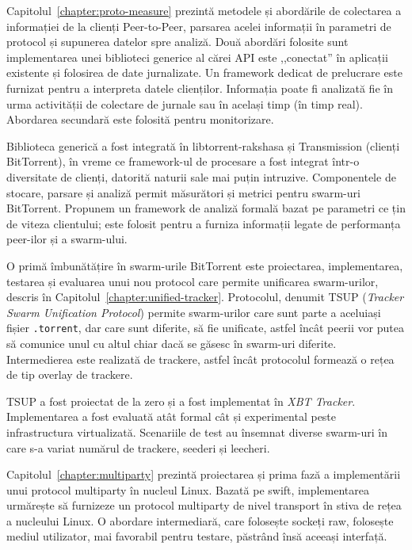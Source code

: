 Capitolul~\ref{chapter:proto-measure} prezintă metodele și abordările de
colectarea a informației de la clienți Peer-to-Peer, parsarea acelei
informații în parametri de protocol și supunerea datelor spre analiză. Două
abordări folosite sunt implementarea unei biblioteci generice al cărei API
este ,,conectat'' în aplicații existente și folosirea de date jurnalizate. Un
framework dedicat de prelucrare este furnizat pentru a interpreta datele
clienților. Informația poate fi analizată fie în urma activității de colectare
de jurnale sau în același timp (în timp real). Abordarea secundară este
folosită pentru monitorizare.

Biblioteca generică a fost integrată în libtorrent-rakshasa și Transmission
(clienți BitTorrent), în vreme ce framework-ul de procesare a fost integrat
într-o diversitate de clienți, datorită naturii sale mai puțin intruzive.
Componentele de stocare, parsare și analiză permit măsurători și metrici
pentru swarm-uri BitTorrent. Propunem un framework de analiză formală bazat pe
parametri ce țin de viteza clientului; este folosit pentru a furniza
informații legate de performanța peer-ilor și a swarm-ului.

O primă îmbunătățire în swarm-urile BitTorrent este proiectarea,
implementarea, testarea și evaluarea unui nou protocol care permite unificarea
swarm-urilor, descris în Capitolul~\ref{chapter:unified-tracker}. Protocolul,
denumit TSUP
(\textit{Tracker Swarm Unification Protocol}) permite swarm-urilor care sunt
parte a aceluiași fișier \texttt{.torrent}, dar care sunt diferite, să fie
unificate, astfel încât peerii vor putea să comunice unul cu altul chiar dacă
se găsesc în swarm-uri diferite. Intermedierea este realizată de trackere,
astfel încât protocolul formează o rețea de tip overlay de trackere.

TSUP a fost proiectat de la zero și a fost implementat în \textit{XBT
Tracker}. Implementarea a fost evaluată atât formal cât și experimental peste
infrastructura virtualizată. Scenariile de test au însemnat diverse swarm-uri
în care s-a variat numărul de trackere, seederi și leecheri.

Capitolul~\ref{chapter:multiparty} prezintă proiectarea și prima fază a
implementării unui protocol multiparty în nucleul Linux. Bazată pe swift,
implementarea urmărește să furnizeze un protocol multiparty de nivel transport
în stiva de rețea a nucleului Linux. O abordare intermediară, care folosește
sockeți raw, folosește mediul utilizator, mai favorabil pentru testare,
păstrând însă aceeași interfață.

